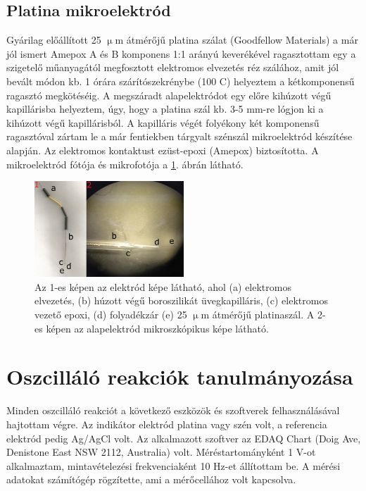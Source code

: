 \subsection{Platina mikroelektród}
Gyárilag előállított 25 $\upmu$m átmérőjű platina szálat (Goodfellow Materials) a már jól ismert Amepox A és B komponens 1:1 arányú keverékével ragasztottam egy a szigetelő műanyagától megfosztott elektromos elvezetés réz szálához, amit jól bevált módon kb. 1 órára szárítószekrénybe (100 \textdegree C) helyeztem a kétkomponensű ragasztó megkötéséig. A megszáradt alapelektródot egy előre kihúzott végű kapillárisba helyeztem, úgy, hogy a platina szál kb. 3-5 mm-re lógjon ki a kihúzott végű kapillárisból. A kapilláris végét folyékony két komponensű ragasztóval zártam le a már fentiekben tárgyalt szénszál mikroelektród készítése alapján. Az elektromos kontaktust ezüst-epoxi (Amepox) biztosította. A mikroelektród fótója és mikrofotója a \ref{fig:platina}. ábrán látható.
\begin{figure}
\centering
\includegraphics[width=0.5\textwidth]{img/platina.png}
\caption{Az 1-es képen az elektród képe látható, ahol (a) elektromos elvezetés, (b) húzott végű boroszilikát üvegkapilláris, (c) elektromos vezető epoxi, (d) folyadékzár  (e) 25 $\upmu$m átmérőjű platinaszál. A 2-es képen az alapelektród mikroszkópikus képe látható.}
\label{fig:platina}
\end{figure}


\section{Oszcilláló reakciók tanulmányozása} 

Minden oszcilláló reakciót a következő eszközök és szoftverek felhasználásával hajtottam végre. Az indikátor elektród platina vagy szén volt, a referencia elektród pedig Ag/AgCl volt. Az alkalmazott szoftver az EDAQ Chart (Doig Ave, Denistone East NSW 2112, Australia) volt. Méréstartományként 1 V-ot alkalmaztam, mintavételezési frekvenciaként 10 Hz-et állítottam be. A mérési adatokat számítógép rögzítette, ami a mérőcellához volt kapcsolva.

